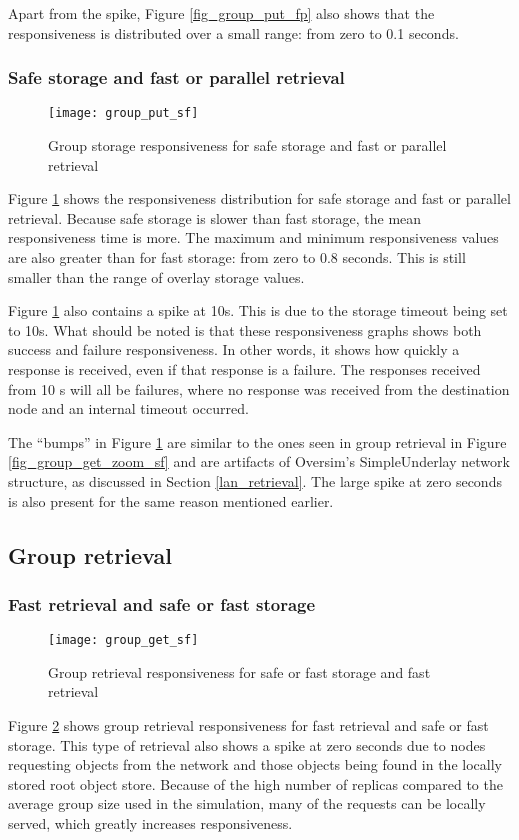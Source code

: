 Apart from the spike, Figure \ref{fig_group_put_fp} also shows that the responsiveness is distributed over a small range: from zero to 0.1 seconds.

\subsubsection{Safe storage and fast or parallel retrieval}
\begin{figure}[htbp]
 \centering
 \texttt{[image: group\_put\_sf]}
 \caption{Group storage responsiveness for safe storage and fast or parallel retrieval}
 \label{fig_group_put_sf}
\end{figure}
%
Figure \ref{fig_group_put_sf} shows the responsiveness distribution for safe storage and fast or parallel retrieval. Because safe storage is slower than fast storage, the mean responsiveness time is more. The maximum and minimum responsiveness values are also greater than for fast storage: from zero to 0.8 seconds. This is still smaller than the range of overlay storage values.

Figure \ref{fig_group_put_sf} also contains a spike at 10s. This is due to the storage timeout being set to 10s. What should be noted is that these responsiveness graphs shows both success and failure responsiveness. In other words, it shows how quickly a response is received, even if that response is a failure. The responses received from 10 s will all be failures, where no response was received from the destination node and an internal timeout occurred.

The ``bumps'' in Figure \ref{fig_group_put_sf} are similar to the ones seen in group retrieval in Figure \ref{fig_group_get_zoom_sf} and are artifacts of Oversim's SimpleUnderlay network structure, as discussed in Section \ref{lan_retrieval}. The large spike at zero seconds is also present for the same reason mentioned earlier.

\subsection{Group retrieval}
\subsubsection{Fast retrieval and safe or fast storage}
\begin{figure}[htbp]
 \centering
 \texttt{[image: group\_get\_sf]}
 \caption{Group retrieval responsiveness for safe or fast storage and fast retrieval}
 \label{fig_group_get_sf}
\end{figure}
%
Figure \ref{fig_group_get_sf} shows group retrieval responsiveness for fast retrieval and safe or fast storage. This type of retrieval also shows a spike at zero seconds due to nodes requesting objects from the network and those objects being found in the locally stored root object store. Because of the high number of replicas compared to the average group size used in the simulation, many of the requests can be locally served, which greatly increases responsiveness.

